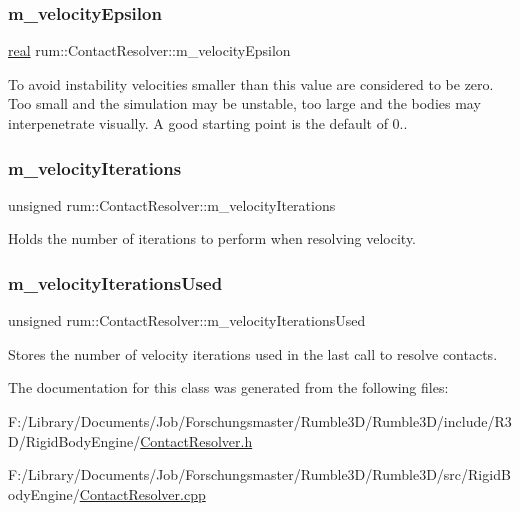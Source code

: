 \subsubsection{\texorpdfstring{m\+\_\+velocity\+Epsilon}{m\_velocityEpsilon}}
{\footnotesize\ttfamily \hyperlink{namespacerum_a7e8cca23573d5eaead0f138cbaa4862c}{real} rum\+::\+Contact\+Resolver\+::m\+\_\+velocity\+Epsilon\hspace{0.3cm}{\ttfamily [protected]}}

To avoid instability velocities smaller than this value are considered to be zero. Too small and the simulation may be unstable, too large and the bodies may interpenetrate visually. A good starting point is the default of 0.. \mbox{\label{classrum_1_1_contact_resolver_a69b94c3b3bffe713655ed4b2209d17c3}} 
\subsubsection{\texorpdfstring{m\+\_\+velocity\+Iterations}{m\_velocityIterations}}
{\footnotesize\ttfamily unsigned rum\+::\+Contact\+Resolver\+::m\+\_\+velocity\+Iterations\hspace{0.3cm}{\ttfamily [protected]}}

Holds the number of iterations to perform when resolving velocity. \mbox{\label{classrum_1_1_contact_resolver_a1f26bcb510350f094a9488c09125bcd7}} 
\subsubsection{\texorpdfstring{m\+\_\+velocity\+Iterations\+Used}{m\_velocityIterationsUsed}}
{\footnotesize\ttfamily unsigned rum\+::\+Contact\+Resolver\+::m\+\_\+velocity\+Iterations\+Used\hspace{0.3cm}{\ttfamily [protected]}}

Stores the number of velocity iterations used in the last call to resolve contacts. 

The documentation for this class was generated from the following files\+:\begin{DoxyCompactItemize}
\item 
F\+:/\+Library/\+Documents/\+Job/\+Forschungsmaster/\+Rumble3\+D/\+Rumble3\+D/include/\+R3\+D/\+Rigid\+Body\+Engine/\hyperlink{_contact_resolver_8h}{Contact\+Resolver.\+h}\item 
F\+:/\+Library/\+Documents/\+Job/\+Forschungsmaster/\+Rumble3\+D/\+Rumble3\+D/src/\+Rigid\+Body\+Engine/\hyperlink{_contact_resolver_8cpp}{Contact\+Resolver.\+cpp}\end{DoxyCompactItemize}
